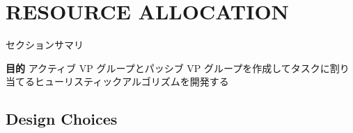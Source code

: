 
\section{RESOURCE ALLOCATION}
\label{sec: resource allocation}

\begin{frame}{セクションサマリ}
    \begin{itembox}[l]{\textbf{目的}}
        アクティブ VP グループとパッシブ VP グループを作成してタスクに割り当てるヒューリスティックアルゴリズムを開発する
    \end{itembox}
\end{frame}

\subsection{Design Choices}
\label{ssec: design choices}

